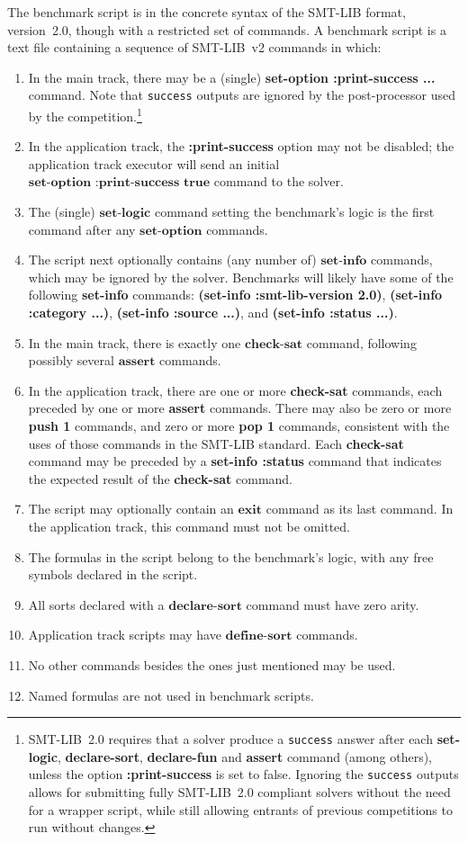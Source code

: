 \documentclass[12pt]{article}
\newcommand{\akey}[1]{\textbf{#1}}
\begin{document}
The benchmark script is in the concrete syntax of the SMT-LIB format,
version~2.0, though with a restricted set of commands.  A benchmark
script is a text file containing a sequence of SMT-LIB~v2 commands in
which:
%
\begin{enumerate}
\item In the main track, there may be a (single) \akey{set-option
  :print-success ...} command.  Note that {\tt success} outputs are
  ignored by the post-processor used by the
  competition.\footnote{SMT-LIB~2.0 requires that a solver produce a
    \texttt{success} answer after each \akey{set-logic},
    \akey{declare-sort}, \akey{declare-fun} and \akey{assert} command
    (among others), unless the option \akey{:print-success} is set to
    false.  Ignoring the \texttt{success} outputs allows for
    submitting fully SMT-LIB~2.0 compliant solvers without the need
    for a wrapper script, while still allowing entrants of previous
    competitions to run without changes.}
\item In the application track, the \akey{:print-success} option may
  not be disabled; the application track executor will send an initial
  $\akey{set-option :print-success true}$ command to the solver.
\item The (single) $\akey{set-logic}$ command setting the benchmark's
  logic is the first command after any $\akey{set-option}$ commands.
\item The script next optionally contains (any number of)
  $\akey{set-info}$ commands, which may be ignored by the
  solver. Benchmarks will likely have some of the following
  \akey{set-info} commands: \akey{(set-info :smt-lib-version 2.0)},
  \akey{(set-info :category ...)}, \akey{(set-info :source ...)}, and
  \akey{(set-info :status ...)}.
\item In the main track, there is exactly one $\akey{check-sat}$
  command, following possibly several $\akey{assert}$ commands.
\item In the application track, there are one or more \akey{check-sat}
  commands, each preceded by one or more \akey{assert} commands.
  There may also be zero or more \akey{push 1} commands, and zero or
  more \akey{pop 1} commands, consistent with the uses of those
  commands in the SMT-LIB standard. Each \akey{check-sat} command may
  be preceded by a \akey{set-info :status} command that indicates the
  expected result of the \akey{check-sat} command.
\item The script may optionally contain an $\akey{exit}$ command as
  its last command.  In the application track, this command must not
  be omitted.
\item The formulas in the script belong to the benchmark's logic, with
  any free symbols declared in the script.
\item All sorts declared with a $\akey{declare-sort}$ command must
  have zero arity.
\item Application track scripts may have $\akey{define-sort}$
  commands.
\item No other commands besides the ones just mentioned may be used.
\item Named formulas are not used in benchmark scripts.
\end{enumerate}
\end{document}
